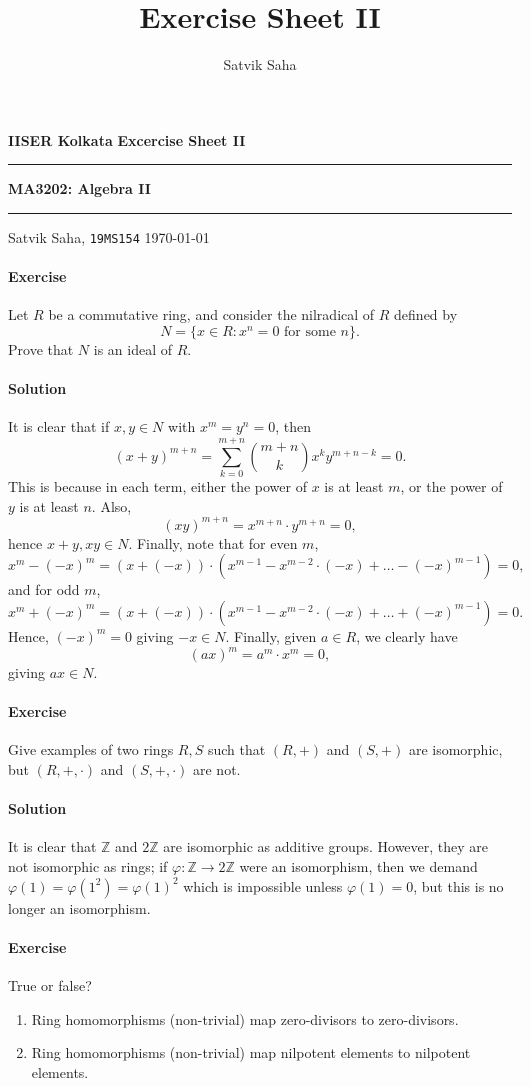 \documentclass[10pt]{article}
\title{Exercise Sheet II}
\author{Satvik Saha}
\date{}
\newcounter{prob}
\newcommand{\problem}{\stepcounter{prob}\paragraph{Exercise \arabic{prob}}}
\newcommand{\solution}{\paragraph{Solution}}
\newcommand{\Z}{\mathbb{Z}}
\begin{document}
    \noindent\textbf{IISER Kolkata} \hfill \textbf{Excercise Sheet II}
    \vspace{3pt}
    \hrule
    \vspace{3pt}
    \begin{center}
    \LARGE{\textbf{MA3202: Algebra II}}
    \end{center}
    \vspace{3pt}
    \hrule
    \vspace{3pt}
    Satvik Saha, \texttt{19MS154} \hfill \today
    \vspace{20pt}


    \problem Let $R$ be a commutative ring, and consider the nilradical of $R$
    defined by \[
        N = \{x \in R: x^n = 0 \text{ for some } n\}.
    \] Prove that $N$ is an ideal of $R$.

    \solution It is clear that if $x, y \in N$ with $x^m = y^n = 0$, then \[
        (x + y)^{m + n} = \sum_{k = 0}^{m + n} \binom{m + n}{k} x^ky^{m + n - k} = 0.
    \] This is because in each term, either the power of $x$ is at least $m$, or the
    power of $y$ is at least $n$. Also, \[
        (xy)^{m + n} = x^{m + n} \cdot y^{m + n} = 0,
    \] hence $x + y, xy \in N$. Finally, note that for even $m$, \[
        x^m - (-x)^m = (x + (-x))\cdot (x^{m - 1} - x^{m - 2}\cdot(-x) + \dots -
        (-x)^{m - 1}) = 0,
    \] and for odd $m$, \[
        x^m + (-x)^m = (x + (-x))\cdot (x^{m - 1} - x^{m - 2}\cdot(-x) + \dots +
        (-x)^{m - 1}) = 0.
    \] Hence, $(-x)^m = 0$ giving $-x \in N$. Finally, given $a \in R$, we clearly
    have \[
        (ax)^m = a^m \cdot x^m = 0,
    \] giving $ax \in N$.


    \problem Give examples of two rings $R, S$ such that $(R, +)$ and $(S, +)$ are
    isomorphic, but $(R, +, \cdot)$ and $(S, +, \cdot)$ are not.

    \solution It is clear that $\Z$ and $2\Z$ are isomorphic as additive groups.
    However, they are not isomorphic as rings; if $\varphi\colon \Z \to 2\Z$ were an
    isomorphism, then we demand $\varphi(1) = \varphi(1^2) = \varphi(1)^2$ which is
    impossible unless $\varphi(1) = 0$, but this is no longer an isomorphism.


    \problem True or false? \begin{enumerate}
        \item Ring homomorphisms (non-trivial) map zero-divisors to zero-divisors.
        \item Ring homomorphisms (non-trivial) map nilpotent elements to nilpotent
        elements.
    \end{enumerate}
\end{document}
